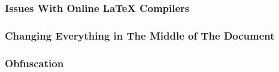 \subsubsection{Issues With Online \LaTeX{} Compilers}


\subsubsection{Changing Everything in The Middle of The Document}


\subsubsection{Obfuscation}


